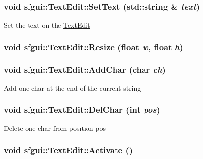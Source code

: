 \hypertarget{classsfgui_1_1TextEdit_16ffefa7f0c0d6e01275b8a2afa5975e}{
\subsubsection[SetText]{\setlength{\rightskip}{0pt plus 5cm}void sfgui::TextEdit::SetText (std::string \& {\em text})}}
\label{classsfgui_1_1TextEdit_16ffefa7f0c0d6e01275b8a2afa5975e}




Set the text on the \hyperlink{classsfgui_1_1TextEdit}{TextEdit} \hypertarget{classsfgui_1_1TextEdit_58afd20cc7cec80bf02603cc5e47143a}{
\subsubsection[Resize]{\setlength{\rightskip}{0pt plus 5cm}void sfgui::TextEdit::Resize (float {\em w}, \/  float {\em h})}}
\label{classsfgui_1_1TextEdit_58afd20cc7cec80bf02603cc5e47143a}


\hypertarget{classsfgui_1_1TextEdit_203952f38ce3bd68695597fee4b4397b}{
\subsubsection[AddChar]{\setlength{\rightskip}{0pt plus 5cm}void sfgui::TextEdit::AddChar (char {\em ch})}}
\label{classsfgui_1_1TextEdit_203952f38ce3bd68695597fee4b4397b}




Add one char at the end of the current string \hypertarget{classsfgui_1_1TextEdit_dc95dab7bac1c41d0cebff1268f80c22}{
\subsubsection[DelChar]{\setlength{\rightskip}{0pt plus 5cm}void sfgui::TextEdit::DelChar (int {\em pos})}}
\label{classsfgui_1_1TextEdit_dc95dab7bac1c41d0cebff1268f80c22}




Delete one char from position pos \hypertarget{classsfgui_1_1TextEdit_bcd256e053ae8f13a5c7f919f79c03c9}{
\subsubsection[Activate]{\setlength{\rightskip}{0pt plus 5cm}void sfgui::TextEdit::Activate ()}}
\label{classsfgui_1_1TextEdit_bcd256e053ae8f13a5c7f919f79c03c9}




